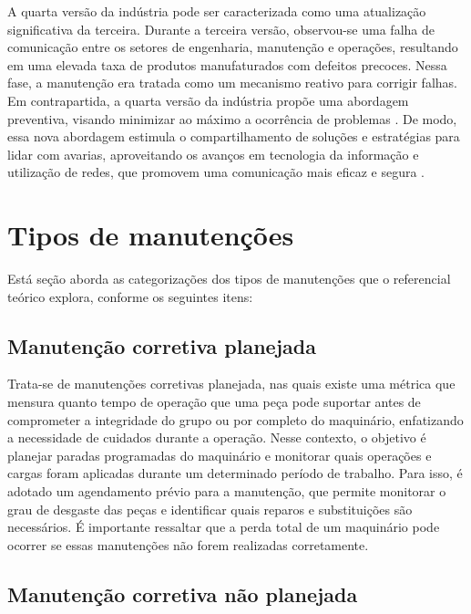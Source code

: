 A quarta versão da indústria pode ser caracterizada como uma atualização significativa da terceira. Durante a terceira versão, observou-se uma falha de comunicação entre os setores de engenharia, manutenção e operações, resultando em uma elevada taxa de produtos manufaturados com defeitos precoces. Nessa fase, a manutenção era tratada como um mecanismo reativo para corrigir falhas. Em contrapartida, a quarta versão da indústria propõe uma abordagem preventiva, visando minimizar ao máximo a ocorrência de problemas \mbox{\cite{a:manutencao_industriav4_2023}.} De modo, essa nova abordagem estimula o compartilhamento de soluções e estratégias para lidar com avarias, aproveitando os avanços em tecnologia da informação e utilização de redes, que promovem uma comunicação mais eficaz e segura \mbox{\cite{a:osi_tcpip_2024}.}

\section{Tipos de manutenções}
\label{sec:tipos_manutencao}

Está seção aborda as categorizações dos tipos de manutenções que o referencial teórico explora, conforme os seguintes itens:

\subsection{Manutenção corretiva planejada}
\label{sub:manutencao_corretiva_planejada}

Trata-se de manutenções corretivas planejada, nas quais existe uma métrica que mensura quanto tempo de operação que uma peça pode suportar antes de comprometer a integridade do grupo ou por completo do maquinário, enfatizando a necessidade de cuidados durante a operação. Nesse contexto, o objetivo é planejar paradas programadas do maquinário e monitorar quais operações e cargas foram aplicadas durante um determinado período de trabalho. Para isso, é adotado um agendamento prévio para a manutenção, que permite monitorar o grau de desgaste das peças e identificar quais reparos e substituições são necessários. É importante ressaltar que a perda total de um maquinário pode ocorrer se essas manutenções não forem realizadas corretamente.

\subsection{Manutenção corretiva não planejada}
\label{sub:manutencao_corretiva_nao_planejada}

